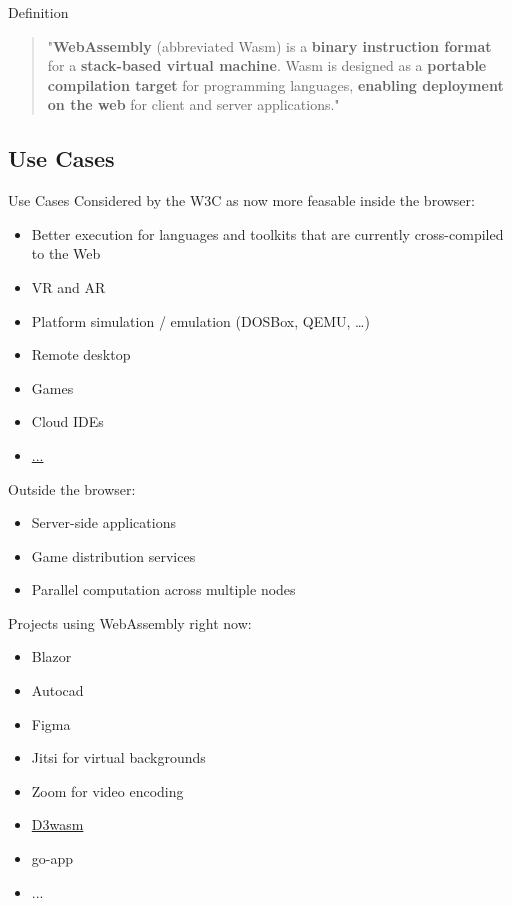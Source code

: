 \documentclass{beamer}
\begin{document}
\begin{frame}{Definition}
    \begin{quotation}
        "\textbf{WebAssembly} (abbreviated Wasm) is a \textbf{binary instruction format} for a \textbf{stack-based virtual machine}. Wasm is designed as a \textbf{portable compilation target} for programming languages, \textbf{enabling deployment on the web} for client and server applications."
    \end{quotation}
\end{frame}

\subsection{Use Cases}

\begin{frame}{Use Cases}
    Considered by the W3C as now more feasable inside the browser:
    \begin{itemize}
        \item Better execution for languages and toolkits that are currently cross-compiled to the Web
        \item VR and AR
        \item Platform simulation / emulation (DOSBox, QEMU, …)
        \item Remote desktop
        \item Games
        \item Cloud IDEs
        \item \href{https://webassembly.org/docs/use-cases/}{...}
    \end{itemize}
    Outside the browser:
    \begin{itemize}
        \item Server-side applications
        \item Game distribution services
        \item Parallel computation across multiple nodes
    \end{itemize}
\end{frame}

\begin{frame}
    Projects using WebAssembly right now:
    \begin{itemize}
        \item Blazor
        \item Autocad
        \item Figma
        \item Jitsi for virtual backgrounds
        \item Zoom for video encoding
        \item \href{https://wasm.continuation-labs.com/d3demo/}{D3wasm}
        \item go-app
        \item ...
    \end{itemize}
\end{frame}
\end{document}
